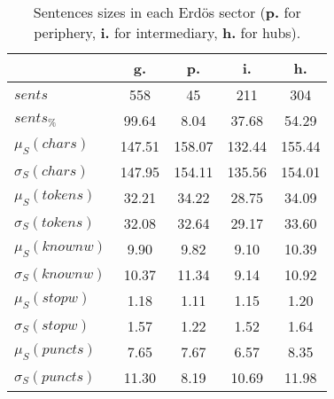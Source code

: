 \begin{table}[h!]
\begin{center}
\begin{tabular}{| l || c | c | c | c |}\hline
 & {\bf g.} & {\bf p.} & {\bf i.} & {\bf h.} \\\hline\hline
$sents$ & 558  & 45  & 211  & 304 \\
$sents_{\%}$ & 99.64  & 8.04  & 37.68  & 54.29 \\\hline
$\mu_S(chars)$ & 147.51  & 158.07  & 132.44  & 155.44 \\
$\sigma_S(chars)$ & 147.95  & 154.11  & 135.56  & 154.01 \\\hline
$\mu_S(tokens)$ & 32.21  & 34.22  & 28.75  & 34.09 \\
$\sigma_S(tokens)$ & 32.08  & 32.64  & 29.17  & 33.60 \\\hline
$\mu_S(knownw)$ & 9.90  & 9.82  & 9.10  & 10.39 \\
$\sigma_S(knownw)$ & 10.37  & 11.34  & 9.14  & 10.92 \\\hline
$\mu_S(stopw)$ & 1.18  & 1.11  & 1.15  & 1.20 \\
$\sigma_S(stopw)$ & 1.57  & 1.22  & 1.52  & 1.64 \\\hline
$\mu_S(puncts)$ & 7.65  & 7.67  & 6.57  & 8.35 \\
$\sigma_S(puncts)$ & 11.30  & 8.19  & 10.69  & 11.98 \\\hline
\end{tabular}
\caption{Sentences sizes in each Erd\"os sector ({{\bf p.}} for periphery, {{\bf i.}} for intermediary, {{\bf h.}} for hubs).}
\end{center}
\end{table}